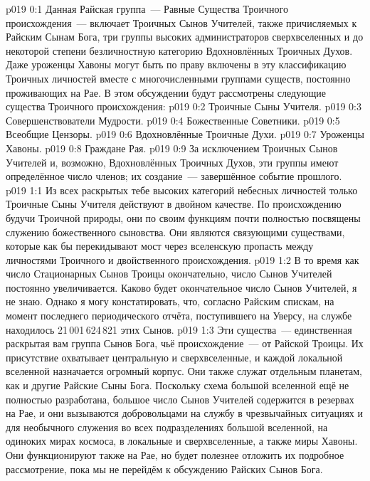\author{Божественный Советник}
\vs p019 0:1 Данная Райская группа~--- Равные Существа Троичного происхождения~--- включает Троичных Сынов Учителей, также причисляемых к Райским Сынам Бога, три группы высоких администраторов сверхвселенных и до некоторой степени безличностную категорию Вдохновлённых Троичных Духов. Даже уроженцы Хавоны могут быть по праву включены в эту классификацию Троичных личностей вместе с многочисленными группами существ, постоянно проживающих на Рае. В этом обсуждении будут рассмотрены следующие существа Троичного происхождения:
\vs p019 0:2 Троичные Сыны Учителя.
\vs p019 0:3 Совершенствователи Мудрости.
\vs p019 0:4 Божественные Советники.
\vs p019 0:5 Всеобщие Цензоры.
\vs p019 0:6 Вдохновлённые Троичные Духи.
\vs p019 0:7 Уроженцы Хавоны.
\vs p019 0:8 Граждане Рая.
\vs p019 0:9 \pc За исключением Троичных Сынов Учителей и, возможно, Вдохновлённых Троичных Духов, эти группы имеют определённое число членов; их создание~--- завершённое событие прошлого.
\vs p019 1:1 Из всех раскрытых тебе высоких категорий небесных личностей только Троичные Сыны Учителя действуют в двойном качестве. По происхождению будучи Троичной природы, они по своим функциям почти полностью посвящены служению божественного сыновства. Они являются связующими существами, которые как бы перекидывают мост через вселенскую пропасть между личностями Троичного и двойственного происхождения.
\vs p019 1:2 В то время как число Стационарных Сынов Троицы окончательно, число Сынов Учителей постоянно увеличивается. Каково будет окончательное число Сынов Учителей, я не знаю. Однако я могу констатировать, что, согласно Райским спискам, на момент последнего периодического отчёта, поступившего на Уверсу, на службе находилось 21\,001\,624\,821 этих Сынов.
\vs p019 1:3 Эти существа~--- единственная раскрытая вам группа Сынов Бога, чьё происхождение~--- от Райской Троицы. Их присутствие охватывает центральную и сверхвселенные, и каждой локальной вселенной назначается огромный корпус. Они также служат отдельным планетам, как и другие Райские Сыны Бога. Поскольку схема большой вселенной ещё не полностью разработана, большое число Сынов Учителей содержится в резервах на Рае, и они вызываются добровольцами на службу в чрезвычайных ситуациях и для необычного служения во всех подразделениях большой вселенной, на одиноких мирах космоса, в локальные и сверхвселенные, а также миры Хавоны. Они функционируют также на Рае, но будет полезнее отложить их подробное рассмотрение, пока мы не перейдём к обсуждению Райских Сынов Бога.
